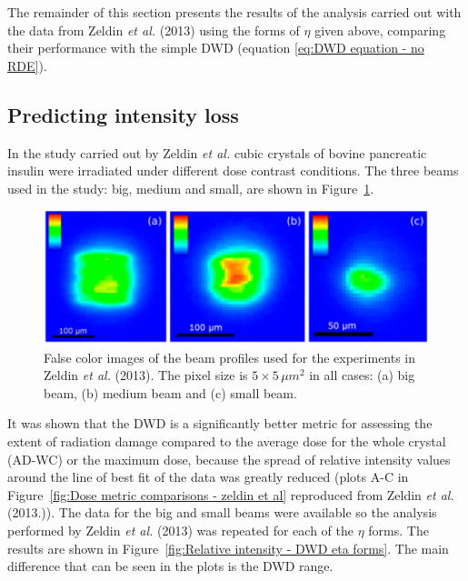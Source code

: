The remainder of this section presents the results of the analysis carried out with the data from Zeldin \textit{et al.} (2013) using the forms of $\eta$ given above, comparing their performance with the simple DWD (equation \ref{eq:DWD equation - no RDE}).

\subsection{Predicting intensity loss}
\label{sub:Predicting intensity loss}
In the study carried out by Zeldin \textit{et al.} \cite{zeldin2013dwd} cubic crystals of bovine pancreatic insulin were irradiated under different dose contrast conditions.
The three beams used in the study: big, medium and small, are shown in Figure~\ref{fig:Big, medium and small beams - Oli experiment}.
\begin{figure}
  \centering
    \includegraphics[width=1\textwidth]{figures/dwd/Oli_beams.png}
    \caption[Beam profiles used in the varying dose contrast regime experiment in Zeldin \textit{et al.} (2013).]{False color images of the beam profiles used for the experiments in Zeldin \textit{et al.} (2013).
    The pixel size is $\text{5} \times \text{5}\,\mu m^2$ in all cases:
    (a) big beam, (b) medium beam and (c) small beam.}
    \label{fig:Big, medium and small beams - Oli experiment}
\end{figure}
It was shown that the DWD is a significantly better metric for assessing the extent of radiation damage compared to the average dose for the whole crystal (AD-WC) or the maximum dose, because the spread of relative intensity values around the line of best fit of the data was greatly reduced (plots A-C in Figure~\ref{fig:Dose metric comparisons - zeldin et al} reproduced from Zeldin \textit{et al.} (2013.)).
The data for the big and small beams were available so the analysis performed by Zeldin \textit{et al.} (2013) was repeated for each of the $\eta$ forms.
The results are shown in Figure~\ref{fig:Relative intensity - DWD eta forms}.
The main difference that can be seen in the plots is the DWD range.
